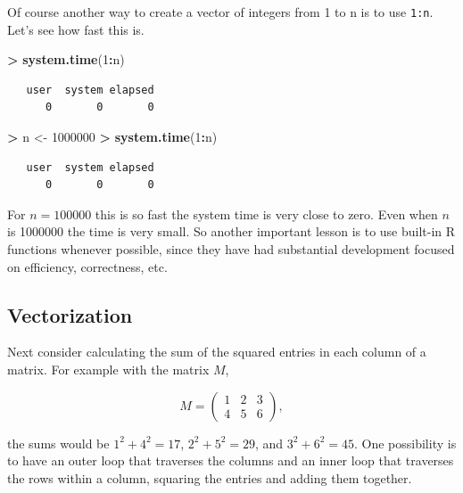 \documentclass[]{krantz}
\makeatletter
\newenvironment{Shaded}{\begin{snugshade}}{\end{snugshade}}
\newcommand{\KeywordTok}[1]{\textcolor[rgb]{0.27,0.27,0.27}{\textbf{#1}}}
\newcommand{\DecValTok}[1]{\textcolor[rgb]{0.06,0.06,0.06}{#1}}
\newcommand{\StringTok}[1]{\textcolor[rgb]{0.5,0.5,0.5}{#1}}
\newcommand{\OperatorTok}[1]{\textcolor[rgb]{0.43,0.43,0.43}{\textbf{#1}}}
\newcommand{\NormalTok}[1]{#1}
\newenvironment{kframe}{%
\medskip{}
\setlength{\fboxsep}{.8em}
 \def\at@end@of@kframe{}%
 \ifinner\ifhmode%
  \def\at@end@of@kframe{\end{minipage}}%
  \begin{minipage}{\columnwidth}%
 \fi\fi%
 \def\FrameCommand##1{\hskip\@totalleftmargin \hskip-\fboxsep
 \colorbox{shadecolor}{##1}\hskip-\fboxsep
     \hskip-\linewidth \hskip-\@totalleftmargin \hskip\columnwidth}%
 \MakeFramed {\advance\hsize-\width
   \@totalleftmargin\z@ \linewidth\hsize
   \@setminipage}}%
 {\par\unskip\endMakeFramed%
 \at@end@of@kframe}
\renewenvironment{Shaded}{\begin{kframe}}{\end{kframe}}
\makeatother
\begin{document}
Of course another way to create a vector of integers from 1 to n is to
use \texttt{1:n}. Let's see how fast this is.

\begin{Shaded}
\begin{Highlighting}[]
\OperatorTok{>}\StringTok{ }\KeywordTok{system.time}\NormalTok{(}\DecValTok{1}\OperatorTok{:}\NormalTok{n)}
\end{Highlighting}
\end{Shaded}

\begin{verbatim}
   user  system elapsed 
      0       0       0 
\end{verbatim}

\begin{Shaded}
\begin{Highlighting}[]
\OperatorTok{>}\StringTok{ }\NormalTok{n <-}\StringTok{ }\DecValTok{1000000}
\OperatorTok{>}\StringTok{ }\KeywordTok{system.time}\NormalTok{(}\DecValTok{1}\OperatorTok{:}\NormalTok{n)      }
\end{Highlighting}
\end{Shaded}

\begin{verbatim}
   user  system elapsed 
      0       0       0 
\end{verbatim}

For \(n=100000\) this is so fast the system time is very close to zero.
Even when \(n\) is 1000000 the time is very small. So another important
lesson is to use built-in R functions whenever possible, since they have
had substantial development focused on efficiency, correctness, etc.

\subsection{Vectorization}\label{vectorization}

Next consider calculating the sum of the squared entries in each column
of a matrix. For example with the matrix \(M\),

\[
M = \left(\begin{array}{ccc}
1 & 2 & 3 \\
4 & 5 & 6
\end{array}\right),
\]

the sums would be \(1^2 + 4^2 = 17\), \(2^2 + 5^2 = 29\), and
\(3^2 + 6^2 = 45\). One possibility is to have an outer loop that
traverses the columns and an inner loop that traverses the rows within a
column, squaring the entries and adding them together.
\end{document}
